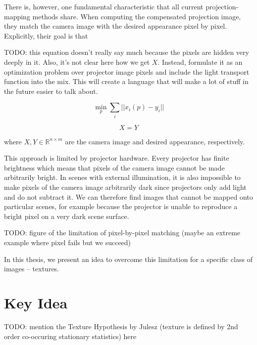 There is, however, one fundamental characteristic that all current projection-mapping methods share. When computing the compensated projection image, they match the camera image with the desired appearance pixel by pixel. Explicitly, their goal is that

{\color{red} TODO: this equation doesn't really say much because the pixels are hidden very deeply in it. Also, it's not clear here how we get \(X\). Instead, formulate it as an optimization problem over projector image pixels and include the light transport function into the mix. This will create a language that will make a lot of stuff in the future easier to talk about.}

\begin{equation}
    \label{eq:projection_mapping-per_pixel-better}
    \min_p \sum_i || x_i(p) - y_i ||
\end{equation}

\begin{equation}
    \label{eq:projection_mapping-per_pixel}
    X = Y
\end{equation}

where \(X,Y \in \mathbb{R}^{n \times m}\) are the camera image and desired appearance, respectively.

This approach is limited by projector hardware. Every projector has finite brightness which means that pixels of the camera image cannot be made arbitrarily bright. In scenes with external illumination, it is also impossible to make pixels of the camera image arbitrarily dark since projectors only add light and do not subtract it. We can therefore find images that cannot be mapped onto particular scenes, for example because the projector is unable to reproduce a bright pixel on a very dark scene surface.

{\color{red} TODO: figure of the limitation of pixel-by-pixel matching (maybe an extreme example where pixel fails but we succeed)}

In this thesis, we present an idea to overcome this limitation for a specific class of images -- textures.

\section{Key Idea}
\label{section:intro-key_idea}

{\color{red} TODO: mention the Texture Hypothesis by Julesz (texture is defined by 2nd order co-occuring stationary statistics) here}

